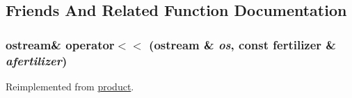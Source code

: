 \subsection{Friends And Related Function Documentation}
\hypertarget{classfertilizer_a5a2254ccb8f746d7d2c66c39a00a3f18}{
\subsubsection[{operator$<$$<$}]{\setlength{\rightskip}{0pt plus 5cm}ostream\& operator$<$$<$ (ostream \& {\em os}, \/  const {\bf fertilizer} \& {\em afertilizer})}}
\label{classfertilizer_a5a2254ccb8f746d7d2c66c39a00a3f18}


Reimplemented from \hyperlink{classproduct_a1b6bf2f2c82a18a17907ee1192fd94bb}{product}.

